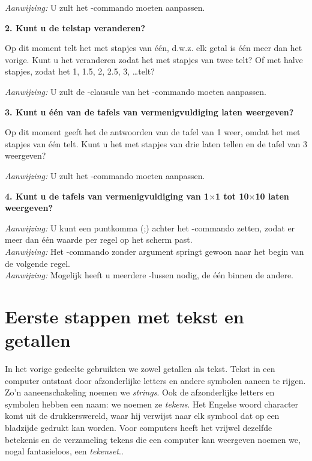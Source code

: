 {\em Aanwijzing:} U zult het -commando moeten aanpassen.

{\bf 2. Kunt u de telstap veranderen?}

Op dit moment telt het met stapjes van één, d.w.z. elk getal is één meer dan het vorige. Kunt u het veranderen zodat het met stapjes van twee telt? Of met halve stapjes, zodat het 1, 1.5, 2, 2.5, 3, \ldots telt?

{\em Aanwijzing:} U zult de -clausule van het -commando moeten aanpassen.


{\bf 3. Kunt u één van de tafels van vermenigvuldiging laten weergeven?}

Op dit moment geeft het de antwoorden van de tafel van 1 weer, omdat het met stapjes van één telt. Kunt u het met stapjes van drie laten tellen en de tafel van 3 weergeven?

{\em Aanwijzing:} U zult het -commando moeten aanpassen.

{\bf 4. Kunt u de tafels van vermenigvuldiging van 1$\times$1 tot 10$\times$10 laten weergeven?}

{\em Aanwijzing:} U kunt een puntkomma (;) achter het -commando zetten, zodat er meer dan één waarde per regel op het scherm past.\\  {\em Aanwijzing:} Het -commando zonder argument springt gewoon naar het begin van de volgende regel.\\  {\em Aanwijzing:} Mogelijk heeft u meerdere -lussen nodig, de één binnen de andere.

\section{Eerste stappen met tekst en getallen}

In het vorige gedeelte gebruikten we zowel getallen als tekst. Tekst in een computer ontstaat door afzonderlijke letters en andere symbolen aaneen te rijgen. Zo'n aaneenschakeling noemen we {\em strings}. Ook de afzonderlijke letters en symbolen hebben een naam: we noemen ze {\em tekens}. Het Engelse woord character komt uit de drukkerswereld, waar hij verwijst naar elk symbool dat op een bladzijde gedrukt kan worden. Voor computers heeft het vrijwel dezelfde betekenis en de verzameling tekens die een computer kan weergeven noemen we, nogal fantasieloos, een {\em tekenset}..

